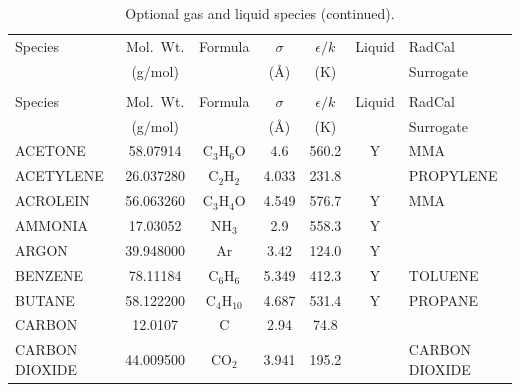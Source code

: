 \documentclass[11pt]{book}
\begin{document}
\clearpage
\begin{longtable}{@{\extracolsep{\fill}}|l|c|c|c|c|c|l|}
\caption[Optional gas and liquid species]{Optional gas and liquid species~\cite{Reid:1}}
\label{tab:gasspecies}\\
\hline
Species &   Mol.~Wt.            & Formula          & $\sigma$ & $\epsilon/k$   & Liquid   & RadCal                     \\
        &   (g/mol)             &                  & (\AA)    & (K)            &          & Surrogate                  \\
\hline \hline
\endfirsthead
\caption[]{Optional gas and liquid species (continued).}\\
\hline
Species &   Mol.~Wt.            & Formula          & $\sigma$ & $\epsilon/k$   & Liquid   & RadCal                     \\
        &   (g/mol)             &                  & (\AA)    & (K)            &          & Surrogate                  \\
\hline \hline
\endhead
{\ct ACETONE}            & 58.07914   & C$_3$H$_6$O      & 4.6      & 560.2    &  Y       &  {\ct MMA}                 \\ \hline
{\ct ACETYLENE}          & 26.037280  & C$_2$H$_2$       & 4.033    & 231.8    &          &  {\ct PROPYLENE}           \\ \hline
{\ct ACROLEIN}           & 56.063260  & C$_3$H$_4$O      & 4.549    & 576.7    &  Y       &  {\ct MMA}                 \\ \hline
{\ct AMMONIA}            & 17.03052  & NH$_3$            & 2.9      & 558.3    &  Y       &                            \\ \hline
{\ct ARGON}              & 39.948000  & Ar               & 3.42     & 124.0    &  Y       &                            \\ \hline
{\ct BENZENE}            & 78.11184   & C$_6$H$_6$       & 5.349    & 412.3    &  Y       &  {\ct TOLUENE}             \\ \hline
{\ct BUTANE}             & 58.122200  & C$_4$H$_{10}$    & 4.687    & 531.4    &  Y       &  {\ct PROPANE}             \\ \hline
{\ct CARBON}             & 12.0107    & C                & 2.94     & 74.8     &          &                            \\ \hline
{\ct CARBON DIOXIDE}     & 44.009500  & CO$_2$           & 3.941    & 195.2    &          &  {\ct CARBON DIOXIDE}      \\ \hline

\end{longtable}
\end{document}
